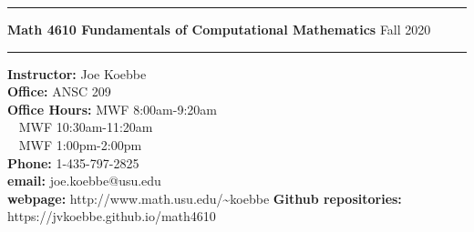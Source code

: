 \documentclass[10pt,fleqn]{article}
\begin{document}
%
\pagestyle{empty}
\vskip0.1in\hrule\vskip0.1in \noindent
{\bf
   Math 4610 Fundamentals of Computational Mathematics
} \hfill Fall 2020
\vskip0.1in\hrule\vskip0.1in
\noindent
{\bf Instructor:} \hfill   Joe Koebbe \\
\smallskip\noindent
{\bf Office:}     \hfill   ANSC 209 \\
\smallskip\noindent
{\bf Office Hours:} \hfill MWF 8:00am-9:20am \\
\smallskip\noindent
{\bf \ } \hfill MWF 10:30am-11:20am \\
\smallskip\noindent
{\bf \ } \hfill MWF 1:00pm-2:00pm \\
\smallskip\noindent
{\bf Phone:}      \hfill   1-435-797-2825 \\
\smallskip\noindent
{\bf email:}      \hfill   joe.koebbe@usu.edu \\
\smallskip\noindent
{\bf webpage:}    \hfill   http://www.math.usu.edu/\~{}koebbe
\smallskip\noindent
{\bf Github repositories:}    \hfill   https://jvkoebbe.github.io/math4610

\smallskip\noindent
\end{document}
